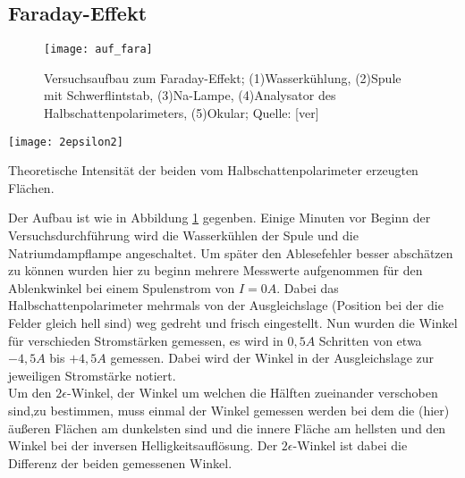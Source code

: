 
\subsection{Faraday-Effekt}
\begin{figure}[h]
\begin{center}
\texttt{[image: auf\_fara]}
\caption{Versuchsaufbau zum Faraday-Effekt; (1)Wasserkühlung, (2)Spule mit Schwerflintstab, (3)Na-Lampe, (4)Analysator des Halbschattenpolarimeters, (5)Okular; Quelle: [ver]}
\label{fig:auf_fara}
\end{center}
\end{figure}
\begin{floatingfigure}[l]{8.0cm}
\begin{center}
\texttt{[image: 2epsilon2]}
\caption{Theoretische Intensität der beiden vom Halbschattenpolarimeter erzeugten Flächen.}
\label{fig:2epsilon}
\end{center}
\end{floatingfigure}
 Der Aufbau ist wie in Abbildung \ref{fig:auf_fara} gegenben. Einige Minuten vor Beginn der Versuchsdurchführung wird die Wasserkühlen der Spule und die Natriumdampflampe angeschaltet. Um später den Ablesefehler besser abschätzen zu können wurden hier zu beginn mehrere Messwerte aufgenommen für den Ablenkwinkel bei einem Spulenstrom von $I=0A$. Dabei das Halbschattenpolarimeter mehrmals von der Ausgleichslage (Position bei der die Felder gleich hell sind) weg gedreht und frisch eingestellt.
Nun wurden die Winkel für verschieden Stromstärken gemessen, es wird in $0,5A$ Schritten von etwa $-4,5A$ bis $+4,5A$ gemessen. Dabei wird der Winkel in der Ausgleichslage zur jeweiligen Stromstärke notiert.\\
Um den $2 \epsilon$-Winkel, der Winkel um welchen die Hälften zueinander verschoben sind,zu bestimmen, muss einmal der Winkel gemessen werden bei dem die (hier) äußeren Flächen am dunkelsten sind und die innere Fläche am hellsten und den Winkel bei der inversen Helligkeitsauflösung. Der $2 \epsilon$-Winkel ist dabei die Differenz der beiden gemessenen Winkel.
